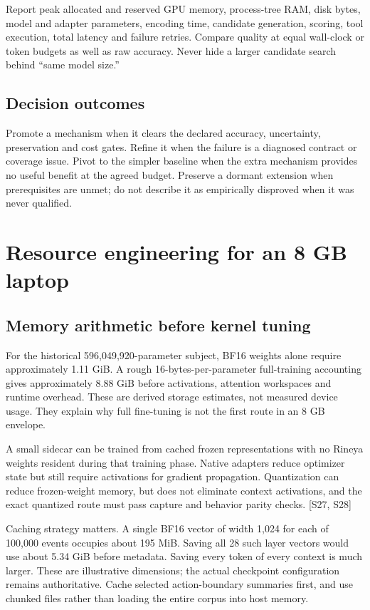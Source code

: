 \documentclass[
  11pt,
  a4paper,
]{article}
\begin{document}
Report peak allocated and reserved GPU memory, process-tree RAM, disk
bytes, model and adapter parameters, encoding time, candidate
generation, scoring, tool execution, total latency and failure retries.
Compare quality at equal wall-clock or token budgets as well as raw
accuracy. Never hide a larger candidate search behind ``same model
size.''

\subsection{Decision outcomes}\label{decision-outcomes}

Promote a mechanism when it clears the declared accuracy, uncertainty,
preservation and cost gates. Refine it when the failure is a diagnosed
contract or coverage issue. Pivot to the simpler baseline when the extra
mechanism provides no useful benefit at the agreed budget. Preserve a
dormant extension when prerequisites are unmet; do not describe it as
empirically disproved when it was never qualified.

\section{Resource engineering for an 8 GB
laptop}\label{resource-engineering-for-an-8-gb-laptop}

\subsection{Memory arithmetic before kernel
tuning}\label{memory-arithmetic-before-kernel-tuning}

For the historical 596,049,920-parameter subject, BF16 weights alone
require approximately 1.11 GiB. A rough 16-bytes-per-parameter
full-training accounting gives approximately 8.88 GiB before
activations, attention workspaces and runtime overhead. These are
derived storage estimates, not measured device usage. They explain why
full fine-tuning is not the first route in an 8 GB envelope.

A small sidecar can be trained from cached frozen representations with
no Rineya weights resident during that training phase. Native adapters
reduce optimizer state but still require activations for gradient
propagation. Quantization can reduce frozen-weight memory, but does not
eliminate context activations, and the exact quantized route must pass
capture and behavior parity checks. {[}S27, S28{]}

Caching strategy matters. A single BF16 vector of width 1,024 for each
of 100,000 events occupies about 195 MiB. Saving all 28 such layer
vectors would use about 5.34 GiB before metadata. Saving every token of
every context is much larger. These are illustrative dimensions; the
actual checkpoint configuration remains authoritative. Cache selected
action-boundary summaries first, and use chunked files rather than
loading the entire corpus into host memory.
\end{document}

